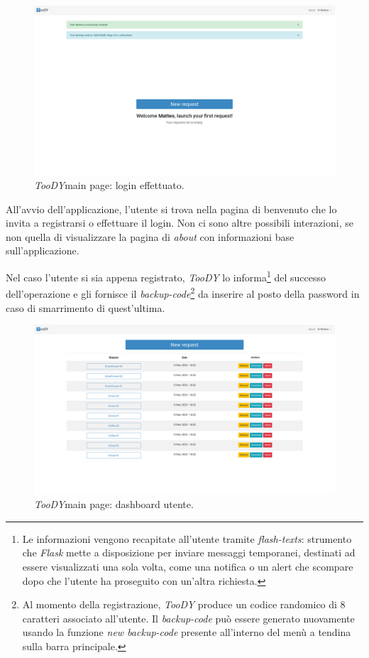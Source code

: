 \documentclass[12pt]{report}
\newcommand{\toody}{\textsl{TooDY}\xspace}
\newcommand{\flask}{\textsl{Flask}\xspace}
\begin{document}
\begin{figure}[H]
\centering
\includegraphics[width=1.0\textwidth]{pagina1-login.png}
\caption{\toody \textsf{main page}: login effettuato.}
\label{fig:pagina1-login}
\end{figure}

All'avvio dell'applicazione, l'utente si trova nella pagina di benvenuto che lo invita a registrarsi o effettuare il login. Non ci sono altre possibili interazioni, se non quella di visualizzare la pagina di \textit{about} con informazioni base sull'applicazione.

Nel caso l'utente si sia appena registrato, \toody lo informa\footnote{Le informazioni vengono recapitate all'utente tramite \textit{flash-texts}: strumento che \flask mette a disposizione per inviare messaggi temporanei, destinati ad essere visualizzati una sola volta, come una notifica o un alert che scompare dopo che l'utente ha proseguito con un'altra richiesta.} del successo dell'operazione e gli fornisce il \textit{backup-code}\footnote{Al momento della registrazione, \toody produce un codice randomico di 8 caratteri associato all'utente. Il \textit{backup-code} può essere generato nuovamente usando la funzione \textit{new backup-code} presente all'interno del menù a tendina sulla barra principale.} da inserire al posto della password in caso di smarrimento di quest'ultima.

\begin{figure}[H]
\centering
\includegraphics[width=1.0\textwidth]{pagina1-lista.png}
\caption{\toody \textsf{main page}: dashboard utente.}
\label{fig:pagina1-login}
\end{figure}
\end{document}

